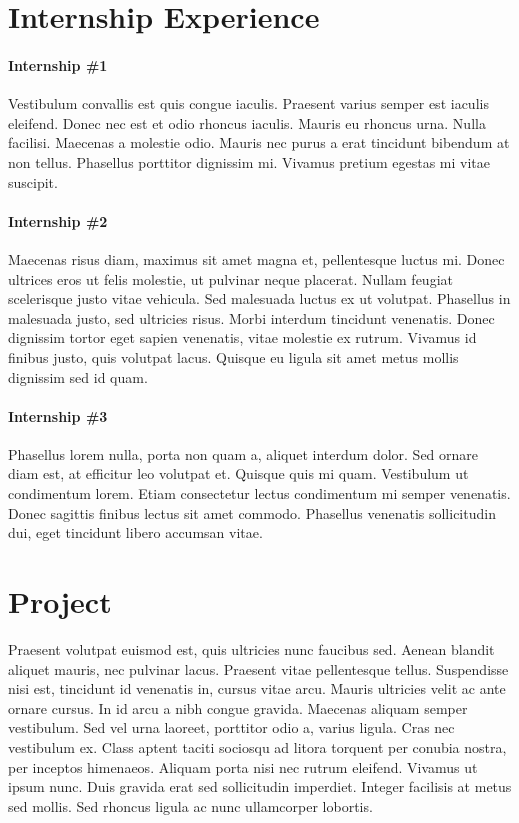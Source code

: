 \documentclass[color, font]{sop}
\begin{document}
\section*{Internship Experience}
\paragraph{Internship \#1} Vestibulum convallis est quis congue iaculis. Praesent varius semper est iaculis eleifend. Donec nec est et odio rhoncus iaculis. Mauris eu rhoncus urna. Nulla facilisi. Maecenas a molestie odio. Mauris nec purus a erat tincidunt bibendum at non tellus. Phasellus porttitor dignissim mi. Vivamus pretium egestas mi vitae suscipit.

\paragraph{Internship \#2} Maecenas risus diam, maximus sit amet magna et, pellentesque luctus mi. Donec ultrices eros ut felis molestie, ut pulvinar neque placerat. Nullam feugiat scelerisque justo vitae vehicula. Sed malesuada luctus ex ut volutpat. Phasellus in malesuada justo, sed ultricies risus. Morbi interdum tincidunt venenatis. Donec dignissim tortor eget sapien venenatis, vitae molestie ex rutrum. Vivamus id finibus justo, quis volutpat lacus. Quisque eu ligula sit amet metus mollis dignissim sed id quam.

\paragraph{Internship \#3} Phasellus lorem nulla, porta non quam a, aliquet interdum dolor. Sed ornare diam est, at efficitur leo volutpat et. Quisque quis mi quam. Vestibulum ut condimentum lorem. Etiam consectetur lectus condimentum mi semper venenatis. Donec sagittis finibus lectus sit amet commodo. Phasellus venenatis sollicitudin dui, eget tincidunt libero accumsan vitae.
\section*{Project}
Praesent volutpat euismod est, quis ultricies nunc faucibus sed. Aenean blandit aliquet mauris, nec pulvinar lacus. Praesent vitae pellentesque tellus. Suspendisse nisi est, tincidunt id venenatis in, cursus vitae arcu. Mauris ultricies velit ac ante ornare cursus. In id arcu a nibh congue gravida. Maecenas aliquam semper vestibulum. Sed vel urna laoreet, porttitor odio a, varius ligula. Cras nec vestibulum ex. Class aptent taciti sociosqu ad litora torquent per conubia nostra, per inceptos himenaeos. Aliquam porta nisi nec rutrum eleifend. Vivamus ut ipsum nunc. Duis gravida erat sed sollicitudin imperdiet. Integer facilisis at metus sed mollis. Sed rhoncus ligula ac nunc ullamcorper lobortis.
\end{document}
